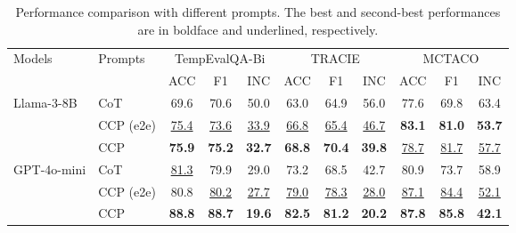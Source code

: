 \begin{table*}[h]
    \centering
    \renewcommand{\arraystretch}{1.2}
    \setlength{\tabcolsep}{5pt}
    \begin{tabular}{l |l |c c c c c c c c c}
        \toprule
        \multirow{2}{*}{Models} & \multirow{2}{*}{Prompts} & \multicolumn{3}{c}{TempEvalQA-Bi} & \multicolumn{3}{c}{TRACIE} & \multicolumn{3}{c}{MCTACO} \\
        \cmidrule(lr){3-5} \cmidrule(lr){6-8} \cmidrule(lr){9-11}
        & & ACC & F1 & INC & ACC & F1 & INC & ACC & F1 & INC \\
        \midrule
        Llama-3-8B & CoT & 69.6 & 70.6 & 50.0 & 63.0 & 64.9 & 56.0 & 77.6 & 69.8 & 63.4 \\
                   & CCP (e2e) & \underline{75.4} & \underline{73.6} & \underline{33.9} & \underline{66.8} & \underline{65.4} & \underline{46.7} & \textbf{83.1} & \textbf{81.0} & \textbf{53.7} \\
                   & CCP        & \textbf{75.9} & \textbf{75.2} & \textbf{32.7} & \textbf{68.8} & \textbf{70.4} & \textbf{39.8} & \underline{78.7} & \underline{81.7} & \underline{57.7} \\ \hline
        GPT-4o-mini & CoT & \underline{81.3} & 79.9 & 29.0 & 73.2 & 68.5 & 42.7 & 80.9 & 73.7 & 58.9 \\
                    & CCP (e2e) & 80.8 & \underline{80.2} & \underline{27.7} & \underline{79.0} & \underline{78.3} & \underline{28.0} & \underline{87.1} & \underline{84.4} & \underline{52.1} \\
                    & CCP      & \textbf{88.8} & \textbf{88.7} & \textbf{19.6} & \textbf{82.5} & \textbf{81.2} & \textbf{20.2} & \textbf{87.8} & \textbf{85.8} & \textbf{42.1} \\
        \bottomrule
    \end{tabular}
    \caption{Performance comparison with different prompts. The best and second-best performances are in boldface and underlined, respectively.}
    \label{tab:prompt_sensitivity}
\end{table*}